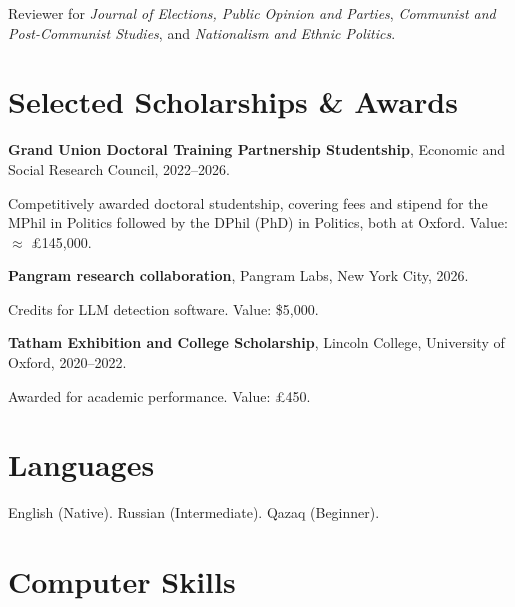 \documentclass[11pt, a4paper]{article}
\begin{document}
Reviewer for \textit{Journal of Elections, Public Opinion and Parties}, \textit{Communist and Post-Communist Studies}, and \textit{Nationalism and Ethnic Politics}.

\section{Selected Scholarships \& Awards}

\begin{samepage}
\textbf{Grand Union Doctoral Training Partnership Studentship}, Economic and Social Research Council, 2022--2026.

Competitively awarded doctoral studentship, covering fees and stipend for the MPhil in Politics followed by the DPhil (PhD) in Politics, both at Oxford. Value: $\approx$ \pounds 145,000.
\end{samepage}

%
%


\begin{samepage}
  \textbf{Pangram research collaboration}, Pangram Labs, New York City, 2026.

  Credits for LLM detection software. Value: \${}5,000.
\end{samepage}

\begin{samepage}
\textbf{Tatham Exhibition and College Scholarship}, Lincoln College, University of Oxford, 2020--2022.

Awarded for academic performance. Value: \pounds 450.
\end{samepage}

\section{Languages}

English (Native). Russian (Intermediate). Qazaq (Beginner).

\section{Computer Skills}
\end{document}
